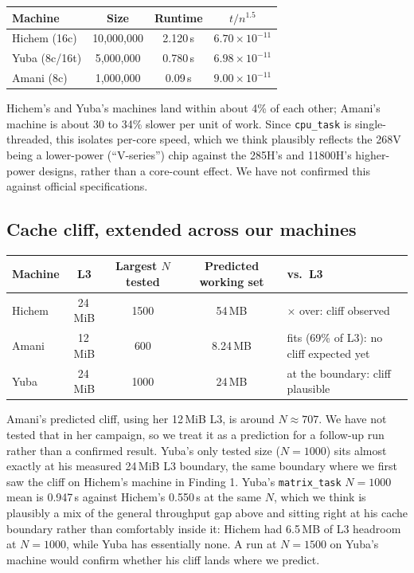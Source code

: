 \documentclass[11pt]{article}
\newcommand{\code}[1]{\texttt{#1}}
\begin{document}
\begin{center}
\begin{tabular}{lccc}
\toprule
Machine & Size & Runtime & $t / n^{1.5}$ \\
\midrule
Hichem (16c) & 10{,}000{,}000 & 2.120\,s & $6.70\times10^{-11}$ \\
Yuba (8c/16t)  & 5{,}000{,}000 & 0.780\,s & $6.98\times10^{-11}$ \\
Amani (8c)   & 1{,}000{,}000  & 0.09\,s  & $9.00\times10^{-11}$ \\
\bottomrule
\end{tabular}
\end{center}

Hichem's and Yuba's machines land within about 4\% of each other; Amani's machine is about 30 to
34\% slower per unit of work. Since \code{cpu\_task} is single-threaded, this isolates per-core
speed, which we think plausibly reflects the 268V being a lower-power (``V-series'') chip against
the 285H's and 11800H's higher-power designs, rather than a core-count effect. We have not
confirmed this against official specifications.

\subsection{Cache cliff, extended across our machines}
\begin{center}
\begin{tabular}{lccc>{\raggedright\arraybackslash}p{3.6cm}}
\toprule
Machine & L3 & Largest $N$ tested & Predicted working set & vs.\ L3 \\
\midrule
Hichem & 24\,MiB & 1500 & 54\,MB & 2.25$\times$ over: cliff observed \\
Amani  & 12\,MiB & 600  & 8.24\,MB & fits (69\% of L3): no cliff expected yet \\
Yuba   & 24\,MiB & 1000 & 24\,MB & at the boundary: cliff plausible \\
\bottomrule
\end{tabular}
\end{center}

Amani's predicted cliff, using her 12\,MiB L3, is around $N \approx 707$. We have not tested that
in her campaign, so we treat it as a prediction for a follow-up run rather than a confirmed result.
Yuba's only tested size ($N=1000$) sits almost exactly at his measured 24\,MiB L3 boundary, the
same boundary where we first saw the cliff on Hichem's machine in Finding 1. Yuba's
\code{matrix\_task} $N=1000$ mean is 0.947\,s against Hichem's 0.550\,s at the same $N$, which we
think is plausibly a mix of the general throughput gap above and sitting right at his cache
boundary rather than comfortably inside it: Hichem had 6.5\,MB of L3 headroom at $N=1000$, while
Yuba has essentially none. A run at $N=1500$ on Yuba's machine would confirm whether his cliff
lands where we predict.
\end{document}
